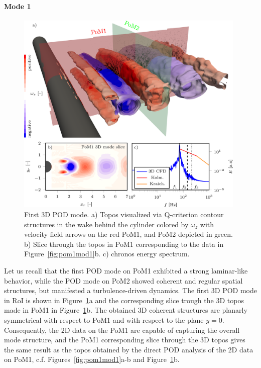{\paragraph{Mode 1}
\begin{figure}[htpb]
    \centering
    \includegraphics[width=0.98\textwidth]{02_images/00_export/figure19.png}
    \caption{{First 3D POD mode. a)} Topos {visualized via} Q-criterion contour structures in the wake behind the cylinder colored by $\omega_z$ with velocity field arrows on the red PoM1, and PoM2 depicted in green. {b) Slice through the topos in PoM1 corresponding to the data in Figure~\ref{fig:pom1mod1}b. c) chronos energy spectrum.}}
    \label{fig:3Dmod1}
\end{figure}

{Let us recall that the first POD mode on PoM1 exhibited a strong laminar-like behavior, while the POD mode on PoM2 showed coherent and regular spatial structures, but manifested a turbulence-driven dynamics. The first 3D POD mode in RoI is shown in Figure~\ref{fig:3Dmod1}a and the corresponding slice trough the 3D topos made in PoM1 in Figure~\ref{fig:3Dmod1}b. The obtained 3D coherent structures are} planarly symmetrical {with respect to} PoM1 {and with respect to the plane $y=0$}. Consequently, the 2D data on the PoM1 are capable of capturing the overall mode structure, and the PoM1 corresponding slice through the 3D topos gives the same result as {the topos} obtained by {the} direct POD analysis of the 2D data on PoM1, c.f. Figures~\ref{fig:pom1mod1}a-b and Figure~\ref{fig:3Dmod1}b.

}
